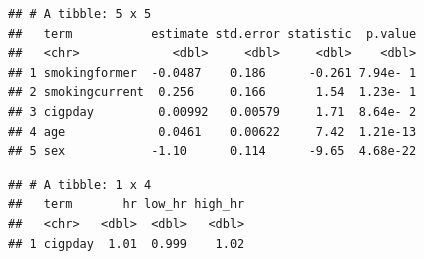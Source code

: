 \documentclass[
]{book}
\newenvironment{Shaded}{\begin{snugshade}}{\end{snugshade}}
\newcommand{\DataTypeTok}[1]{\textcolor[rgb]{0.13,0.29,0.53}{#1}}
\newcommand{\FloatTok}[1]{\textcolor[rgb]{0.00,0.00,0.81}{#1}}
\newcommand{\KeywordTok}[1]{\textcolor[rgb]{0.13,0.29,0.53}{\textbf{#1}}}
\newcommand{\NormalTok}[1]{#1}
\newcommand{\OperatorTok}[1]{\textcolor[rgb]{0.81,0.36,0.00}{\textbf{#1}}}
\newcommand{\StringTok}[1]{\textcolor[rgb]{0.31,0.60,0.02}{#1}}
\begin{document}
\begin{Shaded}
\end{Shaded}

\begin{verbatim}
## # A tibble: 5 x 5
##   term           estimate std.error statistic  p.value
##   <chr>             <dbl>     <dbl>     <dbl>    <dbl>
## 1 smokingformer  -0.0487    0.186      -0.261 7.94e- 1
## 2 smokingcurrent  0.256     0.166       1.54  1.23e- 1
## 3 cigpday         0.00992   0.00579     1.71  8.64e- 2
## 4 age             0.0461    0.00622     7.42  1.21e-13
## 5 sex            -1.10      0.114      -9.65  4.68e-22
\end{verbatim}

\begin{Shaded}
\end{Shaded}

\begin{verbatim}
## # A tibble: 1 x 4
##   term       hr low_hr high_hr
##   <chr>   <dbl>  <dbl>   <dbl>
## 1 cigpday  1.01  0.999    1.02
\end{verbatim}
\end{document}
